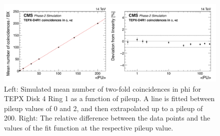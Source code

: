 \begin{figure}[H]
  \centering
  \includegraphics[width=1\columnwidth]{ashish_thesis/michigan_4.png}
  \caption[TEPX two-fold coincidences linear fit for Disk 4 Ring 1]{\onehalfspacing Left: Simulated mean number of two-fold coincidences in phi for TEPX Disk 4 Ring 1 as a function of pileup. A line is fitted between pileup values of 0 and 2, and then extrapolated up to a pileup of 200. Right: The relative difference between the data points and the values of the fit function at the respective pileup value.}
  \label{fig:CMS_4207}
\end{figure}



